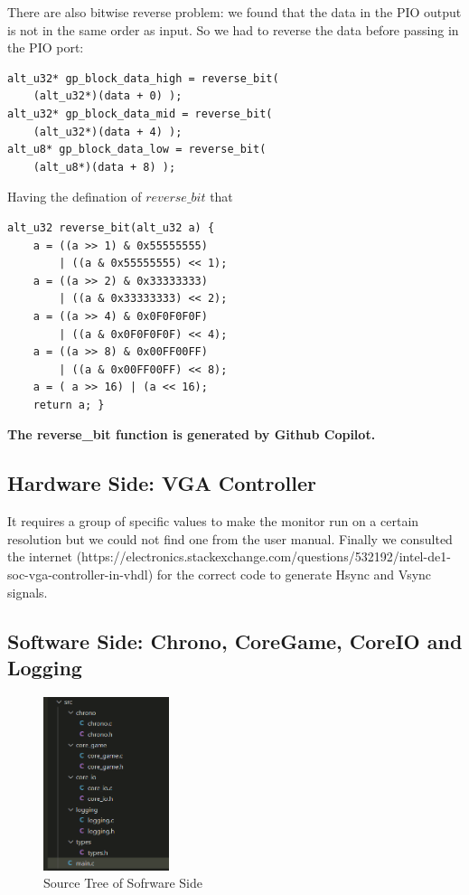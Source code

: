 \documentclass[conference]{IEEEtran}
\begin{document}
There are also bitwise reverse problem: we found that the data in the PIO output is not in the same order as input. So we had to reverse the data before passing in the PIO port:

\begin{lstlisting}
alt_u32* gp_block_data_high = reverse_bit(
    (alt_u32*)(data + 0) );
alt_u32* gp_block_data_mid = reverse_bit(
    (alt_u32*)(data + 4) );
alt_u8* gp_block_data_low = reverse_bit(
    (alt_u8*)(data + 8) );
\end{lstlisting}

Having the defination of $reverse\_bit$ that 

\begin{lstlisting}
alt_u32 reverse_bit(alt_u32 a) {
    a = ((a >> 1) & 0x55555555) 
        | ((a & 0x55555555) << 1);
    a = ((a >> 2) & 0x33333333) 
        | ((a & 0x33333333) << 2);
    a = ((a >> 4) & 0x0F0F0F0F) 
        | ((a & 0x0F0F0F0F) << 4);
    a = ((a >> 8) & 0x00FF00FF) 
        | ((a & 0x00FF00FF) << 8);
    a = ( a >> 16) | (a << 16);
    return a; }
\end{lstlisting}

\textbf{The reverse\_bit function is generated by Github Copilot.}

\subsection{Hardware Side: VGA Controller}
It requires a group of specific values to make the monitor run on a certain resolution but we could not find one from the user manual. Finally we consulted the internet (https://electronics.stackexchange.com/questions/532192/intel-de1-soc-vga-controller-in-vhdl) for the correct code to generate Hsync and Vsync signals.


\subsection{Software Side: Chrono, CoreGame, CoreIO and Logging}
\begin{figure}[h] %
    \centering
    \includegraphics[height=2in]{imageset/tree}
    \caption{Source Tree of Sofrware Side}
    \label{fig_source_tree}
\end{figure}
\end{document}
